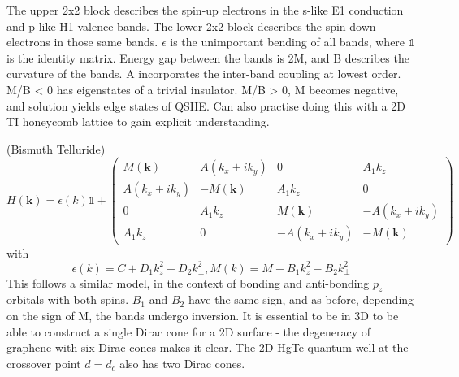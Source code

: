 \documentclass[../mattg_ti-fii_lit-review.tex]{subfiles}
\begin{document}
\begin{outline}
		\4 The upper 2x2 block describes the spin-up electrons in the s-like E1 conduction and p-like H1 valence bands.
		The lower 2x2 block describes the spin-down electrons in those same bands.
		\4 $\epsilon$ is the unimportant bending of all bands, where $\mathds{1}$ is the identity matrix.
		\4 Energy gap between the bands is 2M, and B describes the curvature of the bands. 
		\4 A incorporates the inter-band coupling at lowest order.
		\4 M/B < 0 has eigenstates of a trivial insulator.
		\4 M/B > 0, M becomes negative, and solution yields edge states of QSHE.
		\4 Can also practise doing this with a 2D TI honeycomb lattice to gain explicit understanding. \cite{kane_quantum_2005,kane_z_2005}
		
		\3 \bismuthtelluride{} (Bismuth Telluride) 
		\begin{equation}
		H(\textbf{k}) = \epsilon(k)\mathds{1} + \left(
		\begin{matrix}
		M(\textbf{k}) & A(k_x+ik_y) & 0 & A_1k_z\\
		A(k_x+ik_y) & -M(\textbf{k}) & A_1k_z & 0\\
		0 & A_1k_z & M(\textbf{k}) & -A(k_x+ik_y)\\
		A_1k_z & 0 & -A(k_x+ik_y) & -M(\textbf{k})
		\end{matrix}
		\right)
		\end{equation}
		with \begin{equation}
		\epsilon(k)=C+D_1k_z^2 + D_2k_\perp^2, M(k) = M - B_1k_z^2 - B_2k_\perp^2
		\end{equation}
		\4 This follows a similar model, in the context of bonding and anti-bonding $p_z$ orbitals with both spins. $B_1$ and $B_2$ have the same sign, and as before, depending on the sign of M, the bands undergo inversion.
		\2 It is essential to be in 3D to be able to construct a single Dirac cone for a 2D surface - the degeneracy of graphene with six Dirac cones makes it clear. The 2D HgTe quantum well at the crossover point $d=d_c$ also has two Dirac cones.  
	\end{outline}
	
\end{document}
